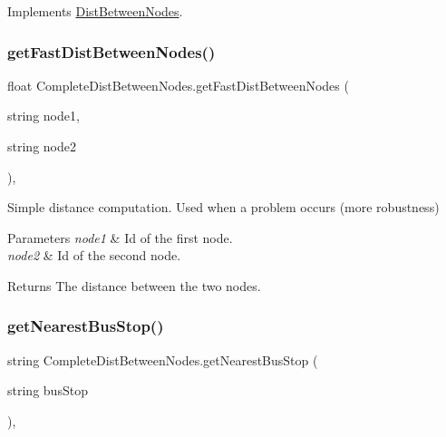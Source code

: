 Implements \hyperlink{classDistBetweenNodes_a2e27c4f9d851343d2d96e53864a841b7}{Dist\+Between\+Nodes}.

\mbox{\label{classCompleteDistBetweenNodes_ae1123f7d5d32574a944e8250cadda450}} 
\subsubsection{\texorpdfstring{get\+Fast\+Dist\+Between\+Nodes()}{getFastDistBetweenNodes()}}
{\footnotesize\ttfamily float Complete\+Dist\+Between\+Nodes.\+get\+Fast\+Dist\+Between\+Nodes (\begin{DoxyParamCaption}\item[{string}]{node1,  }\item[{string}]{node2 }\end{DoxyParamCaption})\hspace{0.3cm}{\ttfamily [inline]}, {\ttfamily [private]}}



Simple distance computation. Used when a problem occurs (more robustness) 


\begin{DoxyParams}{Parameters}
{\em node1} & Id of the first node.\\
\hline
{\em node2} & Id of the second node.\\
\hline
\end{DoxyParams}
\begin{DoxyReturn}{Returns}
The distance between the two nodes.
\end{DoxyReturn}
\mbox{\label{classCompleteDistBetweenNodes_ad6e06a93b4bba24493c9b0b6c7abf7bc}} 
\subsubsection{\texorpdfstring{get\+Nearest\+Bus\+Stop()}{getNearestBusStop()}}
{\footnotesize\ttfamily string Complete\+Dist\+Between\+Nodes.\+get\+Nearest\+Bus\+Stop (\begin{DoxyParamCaption}\item[{string}]{bus\+Stop }\end{DoxyParamCaption})\hspace{0.3cm}{\ttfamily [inline]}, {\ttfamily [private]}}



